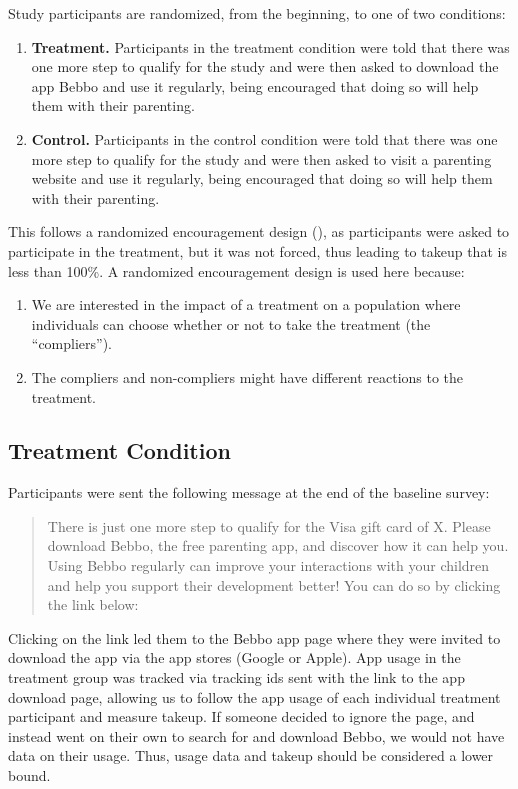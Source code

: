 \documentclass{article}
\begin{document}
\noindent Study participants are randomized, from the beginning, to one of two conditions:

\begin{enumerate}
\item \textbf{Treatment.} Participants in the treatment condition were told that there was one more step to qualify for the study and were then asked to download the app Bebbo and use it regularly, being encouraged that doing so will help them with their parenting.
\item \textbf{Control.} Participants in the control condition were told that there was one more step to qualify for the study and were then asked to visit a parenting website and use it regularly, being encouraged that doing so will help them with their parenting.
\end{enumerate}

\noindent This follows a randomized encouragement design (\cite{Moayyedi2014}), as participants were asked to participate in the treatment, but it was not forced, thus leading to takeup that is less than 100\%. A randomized encouragement design is used here because:

\begin{enumerate}
\item We are interested in the impact of a treatment on a population where individuals can choose whether or not to take the treatment (the “compliers”).
\item The compliers and non-compliers might have different reactions to the treatment.
\end{enumerate}




\subsection*{Treatment Condition}

Participants were sent the following message at the end of the baseline survey:

\begin{quote}
There is just one more step to qualify for the Visa gift card of X. Please download Bebbo, the free parenting app, and discover how it can help you. Using Bebbo regularly can improve your interactions with your children and help you support their development better! You can do so by clicking the link below:
\end{quote}

Clicking on the link led them to the Bebbo app page where they were invited to download the app via the app stores (Google or Apple). App usage in the treatment group was tracked via tracking ids sent with the link to the app download page, allowing us to follow the app usage of each individual treatment participant and measure takeup. If someone decided to ignore the page, and instead went on their own to search for and download Bebbo, we would not have data on their usage. Thus, usage data and takeup should be considered a lower bound.
\end{document}
